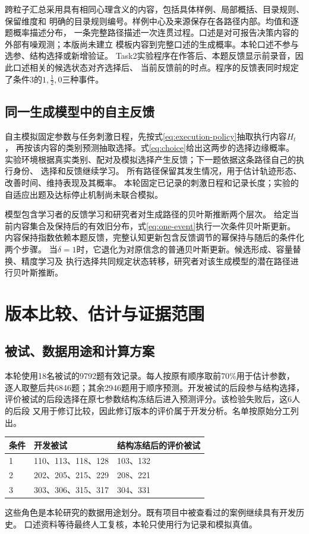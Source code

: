 \documentclass[11pt,a4paper]{article}
\numberwithin{equation}{section}
\begin{document}
跨粒子汇总采用具有相同心理含义的内容，包括具体样例、局部概括、目录规则、保留维度和
明确的目录规则编号。样例中心及来源保存在各路径内部。均值和逐题概率描述分布，
一条完整路径描述一次连贯过程。口述是对可报告决策内容的外部有噪观测；本版尚未建立
模板内容到完整口述的生成概率。本轮口述不参与选参、结构选择或新增验证。
Task2实验程序在作答后、本题反馈显示前录音，因此口述相关的候选状态对齐选择后、
当前反馈前的时点。程序的反馈表同时规定了条件3的$1,\tfrac12,0$三种事件。

\subsection{同一生成模型中的自主反馈}
自主模拟固定参数与任务刺激日程，先按式\eqref{eq:execution-policy}抽取执行内容$H_t$，
再按该内容的类别预测抽取选择。式\eqref{eq:choice}给出这两步的选择边缘概率。
实验环境根据真实类别、配对及模拟选择产生反馈；下一题依据这条路径自己的执行身份、
选择和反馈继续学习。
所有路径保留其发生情况，用于估计轨迹形态、改善时间、维持表现及其概率。
本轮固定已记录的刺激日程和记录长度；实验的自适应出题及达标停止机制尚未联合模拟。

模型包含学习者的反馈学习和研究者对生成路径的贝叶斯推断两个层次。
给定当前内容集合及保持后的有效旧分布，式\eqref{eq:one-event}执行一次条件贝叶斯更新。
内容保持指数依赖本题反馈，完整认知更新包含反馈调节的幂保持与随后的条件化两个步骤。
当$\delta=1$时，它退化为对原信念的普通贝叶斯更新。候选形成、容量替换、精度学习及
执行选择共同规定状态转移，研究者对该生成模型的潜在路径进行贝叶斯推断。

\section{版本比较、估计与证据范围}
\label{sec:evidence}

\subsection{被试、数据用途和计算方案}
本轮使用18名被试的9792题有效记录。每人按原有顺序取前70\%用于估计参数，
逐人取整后共6846题；其余2946题用于顺序预测。开发被试的后段参与结构选择，
评价被试的后段选择在原七参数结构冻结后进入预测评分。该检验失败后，这6人的后段
又用于修订比较，因此修订版本的评价属于开发分析。名单按原始分工列出。
\begin{center}
\begin{tabularx}{\textwidth}{p{1.3cm}Y Y}
\toprule
条件 & 开发被试 & 结构冻结后的评价被试\\
 & 110、113、118、128 & 103、132\\
2 & 202、205、215、229 & 208、221\\
3 & 303、306、315、317 & 304、331\\
\bottomrule
\end{tabularx}
\end{center}
这些角色是本轮研究的数据用途划分。既有项目中被查看过的案例继续具有开发历史。
口述资料等待最终人工复核，本轮只使用行为记录和模拟真值。
\end{document}
